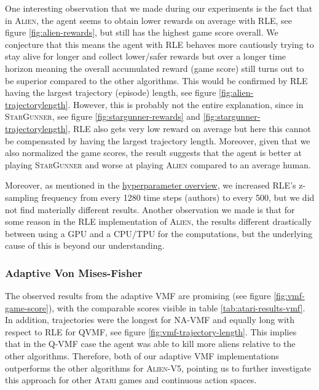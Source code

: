 \documentclass[10pt]{article} %
\begin{document}
One interesting observation that we made during our experiments is the fact that in \textsc{Alien}, the agent seems to obtain lower rewards on average with RLE, see figure \ref{fig:alien-rewards}, but still has the highest game score overall. We conjecture that this means the agent with RLE behaves more cautiously trying to stay alive for longer and collect lower/safer rewards but over a longer time horizon meaning the overall accumulated reward (game score) still turns out to be superior compared to the other algorithms. This would be confirmed by RLE having the largest trajectory (episode) length, see figure \ref{fig:alien-trajectorylength}. However, this is probably not the entire explanation, since in \textsc{StarGunner}, see figure \ref{fig:stargunner-rewards} and \ref{fig:stargunner-trajectorylength}, RLE also gets very low reward on average but here this cannot be compensated by having the largest trajectory length. Moreover, given that we also normalized the game scores, the result suggests that the agent is better at playing \textsc{StarGunner} and worse at playing \textsc{Alien} compared to an average human.

\noindent Moreover, as mentioned in the \hyperlink{hyperparameter-subsection}{hyperparameter overview}, we increased RLE's z-sampling frequency from every 1280 time steps (authors) to every 500, but we did not find materially different results. Another observation we made is that for some reason in the RLE implementation of \textsc{Alien}, the results different drastically between using a GPU and a CPU/TPU for the computations, but the underlying cause of this is beyond our understanding.

\subsubsection{Adaptive Von Mises-Fisher}
The observed results from the adaptive VMF are promising (see figure \ref{fig:vmf-game-score}), with the comparable scores visible in table \ref{tab:atari-results-vmf}. In addition, trajectories were the longest for NA-VMF and equally long with respect to RLE for QVMF, see figure \ref{fig:vmf-trajectory-length}. This implies that 
in the Q-VMF case the agent was able to kill more aliens relative to the other algorithms. Therefore, both of our adaptive VMF implementations outperforms the other algorithms for 
\textsc{Alien-V5}, pointing us to further investigate this approach for other \textsc{Atari} games and continuous action spaces.  
\end{document}
